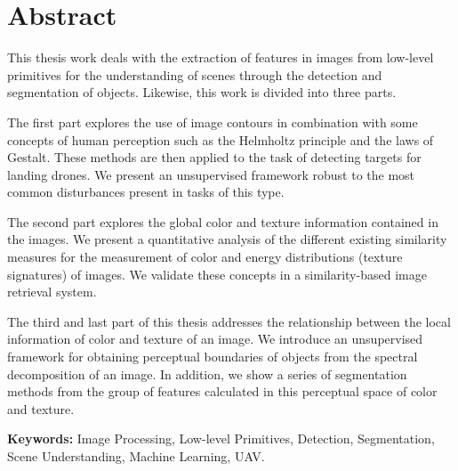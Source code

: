\chapter*{Abstract}


This thesis work deals with the extraction of features in images from low-level primitives for the understanding of scenes through the detection and segmentation of objects. Likewise, this work is divided into three parts.
\newline 

\noindent The first part explores the use of image contours in combination with some concepts of human perception such as the Helmholtz principle and the laws of Gestalt. These methods are then applied to the task of detecting targets for landing drones. We present an unsupervised framework robust to the most common disturbances present in tasks of this type.
\newline

\noindent The second part explores the global color and texture information contained in the images. We present a quantitative analysis of the different existing similarity measures for the measurement of color and energy distributions (texture signatures) of images. We validate these concepts in a similarity-based image retrieval system.
\newline 

\noindent The third and last part of this thesis addresses the relationship between the local information of color and texture of an image. We introduce an unsupervised framework for obtaining perceptual boundaries of objects from the spectral decomposition of an image. In addition, we show a series of segmentation methods from the group of features calculated in this perceptual space of color and texture.

\vspace*{\fill}

\textbf{Keywords:} Image Processing, Low-level Primitives, Detection, Segmentation, Scene Understanding, Machine Learning, UAV.